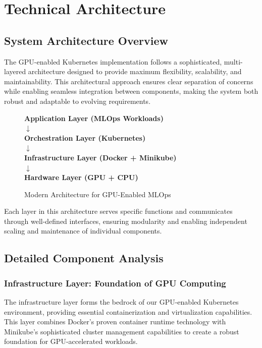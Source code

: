 \documentclass[12pt,a4paper]{report}
\begin{document}
\chapter{Technical Architecture}
\label{chap:architecture}

\section{System Architecture Overview}
The GPU-enabled Kubernetes implementation follows a sophisticated, multi-layered architecture designed to provide maximum flexibility, scalability, and maintainability. This architectural approach ensures clear separation of concerns while enabling seamless integration between components, making the system both robust and adaptable to evolving requirements.

\begin{figure}[h]
    \centering
    \colorbox{codebg}{
        \begin{minipage}{0.8\textwidth}
            \centering
            \textbf{Application Layer (MLOps Workloads)}\\[0.5cm]
            $\downarrow$\\[0.3cm]
            \textbf{Orchestration Layer (Kubernetes)}\\[0.5cm]
            $\downarrow$\\[0.3cm]
            \textbf{Infrastructure Layer (Docker + Minikube)}\\[0.5cm]
            $\downarrow$\\[0.3cm]
            \textbf{Hardware Layer (GPU + CPU)}
        \end{minipage}
    }
    \caption{Modern Architecture for GPU-Enabled MLOps}
    \label{fig:architecture}
\end{figure}

Each layer in this architecture serves specific functions and communicates through well-defined interfaces, ensuring modularity and enabling independent scaling and maintenance of individual components.

\section{Detailed Component Analysis}
\subsection{Infrastructure Layer: Foundation of GPU Computing}
The infrastructure layer forms the bedrock of our GPU-enabled Kubernetes environment, providing essential containerization and virtualization capabilities. This layer combines Docker's proven container runtime technology with Minikube's sophisticated cluster management capabilities to create a robust foundation for GPU-accelerated workloads.
\end{document}
